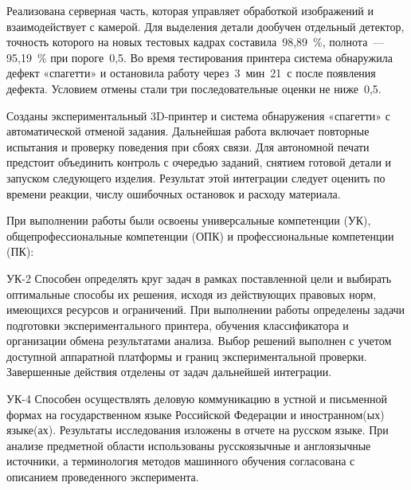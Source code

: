 Реализована серверная часть, которая управляет обработкой изображений и взаимодействует с камерой. Для выделения детали дообучен отдельный детектор, точность которого на новых тестовых кадрах составила~98,89~\%, полнота~--- 95,19~\% при пороге~0,5. Во время тестирования принтера система обнаружила дефект «спагетти» и остановила работу через~3~мин~21~с после появления дефекта. Условием отмены стали три последовательные оценки не ниже~0,5.

Созданы экспериментальный 3D-принтер и система обнаружения «спагетти» с автоматической отменой задания. Дальнейшая работа включает повторные испытания и проверку поведения при сбоях связи. Для автономной печати предстоит объединить контроль с очередью заданий, снятием готовой детали и запуском следующего изделия. Результат этой интеграции следует оценить по времени реакции, числу ошибочных остановок и расходу материала.


При выполнении работы были освоены универсальные компетенции (УК), общепрофессиональные компетенции (ОПК) и профессиональные компетенции (ПК):

УК-2 Способен определять круг задач в рамках поставленной цели и выбирать оптимальные способы их решения, исходя из действующих правовых норм, имеющихся ресурсов и ограничений. При выполнении работы определены задачи подготовки экспериментального принтера, обучения классификатора и организации обмена результатами анализа. Выбор решений выполнен с учетом доступной аппаратной платформы и границ экспериментальной проверки. Завершенные действия отделены от задач дальнейшей интеграции.

УК-4 Способен осуществлять деловую коммуникацию в устной и письменной формах на государственном языке Российской Федерации и иностранном(ых) языке(ах). Результаты исследования изложены в отчете на русском языке. При анализе предметной области использованы русскоязычные и англоязычные источники, а терминология методов машинного обучения согласована с описанием проведенного эксперимента.

